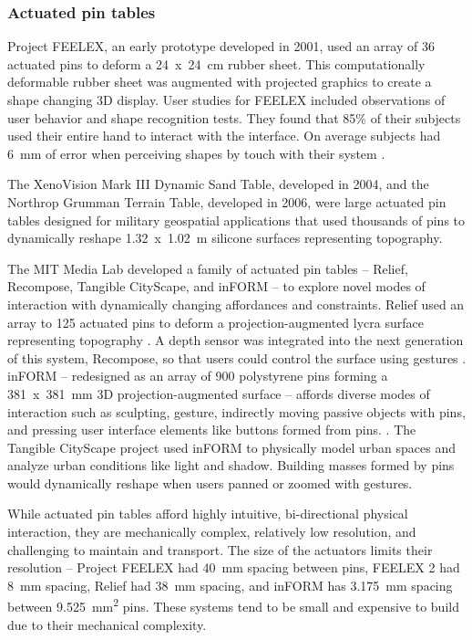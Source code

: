 \documentclass[prodmode,acmtochi]{acmsmall} %
\begin{document}
\subsubsection{Actuated pin tables}
Project FEELEX, an early prototype developed in 2001,
used an array of 36 actuated pins to deform a 24~x~24~cm rubber sheet. 
This computationally deformable rubber sheet
was augmented with projected graphics
to create a shape changing 3D display. %
User studies for FEELEX included
observations of user behavior and
shape recognition tests.
They found that 85\% of their subjects 
used their entire hand to interact with the interface.
On average subjects had 6~mm of error when perceiving shapes by touch
with their system
\cite{Iwata2001}.

The XenoVision Mark III Dynamic Sand Table, developed in 2004, 
and the Northrop Grumman Terrain Table, developed in 2006, 
were large actuated pin tables designed for military geospatial applications
that used thousands of pins
to dynamically reshape 1.32~x~1.02~m silicone surfaces representing topography. 

The MIT Media Lab developed a family of actuated pin tables 
-- Relief, Recompose, Tangible CityScape, and inFORM --
to explore novel modes of interaction with
dynamically changing affordances and constraints. 
%
Relief %
used an array to 125 actuated pins
to deform a
projection-augmented lycra surface representing topography \cite{Leithinger2009}. 
A depth sensor was integrated into 
the next generation of this system, Recompose,
so that users could control the surface using gestures
\cite{Leithinger2011,Blackshaw2011}.
% 
inFORM 
-- redesigned as an array of 900 polystyrene pins 
forming a 381~x~381~mm
3D projection-augmented surface -- 
affords diverse modes of interaction 
such as sculpting, gesture, 
indirectly moving passive objects with pins, 
and pressing user interface elements like buttons formed from pins.
\cite{Follmer2013}. 
The Tangible CityScape project used inFORM to
physically model urban spaces 
and analyze urban conditions like light and shadow.
Building masses formed by pins would dynamically reshape
when users panned or zoomed with gestures. 

While actuated pin tables afford highly intuitive,
bi-directional physical interaction, 
they are mechanically complex, relatively low resolution, 
and challenging to maintain and transport. 
The size of the actuators limits their resolution -- 
Project FEELEX had 40~mm spacing between pins,
FEELEX 2 had 8~mm spacing,
Relief had 38~mm spacing, 
and inFORM has 3.175~mm spacing
between 9.525~mm\textsuperscript{2} pins.
These systems tend to be small and expensive to build
due to their mechanical complexity. 
\end{document}
